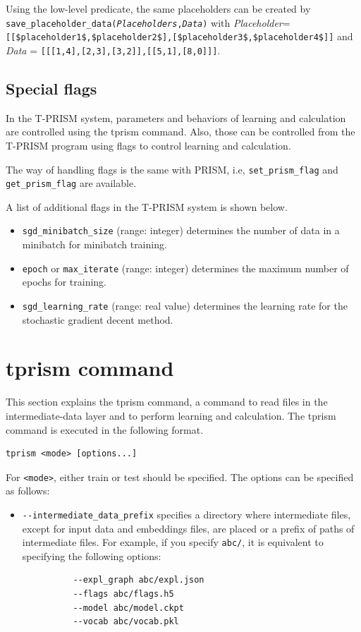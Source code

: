 \documentclass[a4paper]{report}
\begin{document}
Using the low-level predicate, the same placeholders can be created by {\tt save\_placeholder\_data({\it Placeholders},{\it Data})} with
{\it Placeholder}={\tt [[\$placeholder1\$,\$placeholder2\$],[\$placeholder3\$,\$placeholder4\$]]}
and {\it Data} = {\tt [[[1,4],[2,3],[3,2]],[[5,1],[8,0]]]}.

\subsection{Special flags}
In the T-PRISM system, parameters and behaviors of learning and calculation are controlled using the tprism command.
Also, those can be controlled from the T-PRISM program using flags to control learning and calculation.

The way of handling flags is the same with PRISM, i.e, {\tt set\_prism\_flag} and {\tt get\_prism\_flag} are available.


A list of additional flags in the T-PRISM system is shown below.
\begin{itemize}
\item \verb|sgd_minibatch_size| (range: integer) determines the number of data in a minibatch for minibatch training.
\item \verb|epoch| or \verb|max_iterate| (range: integer) determines the maximum number of epochs for training.
\item \verb|sgd_learning_rate| (range: real value) determines the learning rate for the stochastic gradient decent method.
\end{itemize}





\section{tprism command}
\label{sec:tprism_command}

This section explains the tprism command, a command to read files in the intermediate-data layer and to perform learning and calculation.
The tprism command is executed in the following format.
\begin{verbatim}
tprism <mode> [options...]
\end{verbatim}
For \verb|<mode>|, either train or test should be specified.
The options can be specified as follows:
\begin{itemize}
	\item \verb|--intermediate_data_prefix|
specifies a directory where intermediate files, except for input data and embeddings files, are placed or a prefix of paths of intermediate files.
	For example, if you specify {\tt abc/}, it is equivalent to specifying the following options:
	\begin{verbatim}
		  --expl_graph abc/expl.json
		  --flags abc/flags.h5
		  --model abc/model.ckpt
		  --vocab abc/vocab.pkl
	\end{verbatim}
\end{itemize}
\end{document}
